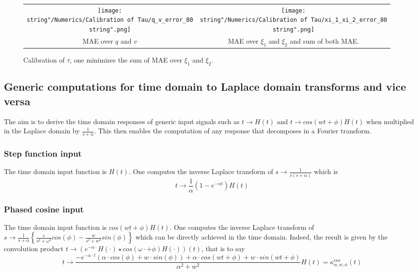 \documentclass[preprint]{elsarticle}
\begin{document}
\begin{figure}[H]
\centering
\begin{tabular}{cc}
\texttt{[image: \\string"/Numerics/Calibration of Tau/q\_v\_error\_80\\string".png]} & \texttt{[image: \\string"/Numerics/Calibration of Tau/xi\_1\_xi\_2\_error\_80\\string".png]}\tabularnewline
MAE over $q$ and $v$ & MAE over $\xi_{1}$ and $\xi_{2}$ and sum of both MAE.\tabularnewline
\end{tabular}
\protect\caption{Calibration of $\tau$, one minimizes the sum of MAE over $\xi_{1}$
and $\xi_{2}$.}
\end{figure}


\subsection{Generic computations for time domain to Laplace domain transforms
and vice versa\label{sub:Generic-computations}}

The aim is to derive the time domain responses of generic input signals
such as $t\rightarrow H\left(t\right)$ and $t\rightarrow cos\left(wt+\phi\right)H\left(t\right)$
when multiplied in the Laplace domain by $\frac{1}{s+\alpha}$. This
then enables the computation of any response that decomposes in a
Fourier transform.


\subsubsection{Step function input}

The time domain input function is $H\left(t\right)$. One computes
the inverse Laplace transform of $s\rightarrow\frac{1}{s\left(s+\alpha\right)}$
which is 
\[
t\rightarrow\frac{1}{\alpha}\left(1-e^{-\alpha t}\right)H\left(t\right)
\]



\subsubsection{Phased cosine input}

The time domain input function is $cos\left(wt+\phi\right)H\left(t\right)$.
One computes the inverse Laplace transform of $s\rightarrow\frac{1}{s+\alpha}\left\{ \frac{s}{s^{2}+\omega^{2}}cos\left(\phi\right)-\frac{w}{s^{2}+w^{2}}sin\left(\phi\right)\right\} $
which can be directly achieved in the time domain. Indeed, the result
is given by the convolution product $t\rightarrow\left(e^{-\alpha\cdot}H\left(\cdot\right)\star cos\left(\omega\cdot+\phi\right)H\left(\cdot\right)\right)\left(t\right)$,
that is to say 
\[
t\rightarrow\frac{-e^{-\alpha\cdot t}\left(\alpha\cdot cos\left(\phi\right)+w\cdot sin\left(\phi\right)\right)+\alpha\cdot cos\left(wt+\phi\right)+w\cdot sin\left(wt+\phi\right)}{\alpha^{2}+w^{2}}H\left(t\right)=\kappa_{\alpha,w,\phi}^{cos}\left(t\right)
\]
\end{document}
